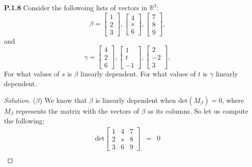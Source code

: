 \documentclass[12pt]{amsart}
\newenvironment{solution}
{\begin{proof}[Solution]}
{\end{proof}}
\begin{document}
\begin{onehalfspace}
        \noindent\textbf{P.1.8} Consider the followoing lists of vectors in $\mathbb{R}^3:$
        \begin{displaymath}
            \beta = \left[\begin{matrix} 1 \\ 2 \\ 3 \end{matrix}\right],
            \left[\begin{matrix}4 \\ s\\ 6\end{matrix}\right],
            \left[\begin{matrix}7 \\ 8\\ 9\end{matrix}\right],
        \end{displaymath}
        and
        \begin{displaymath}
            \gamma = \left[\begin{matrix} 4 \\ 2 \\ 6 \end{matrix}\right],
            \left[\begin{matrix}1 \\ t\\ -1\end{matrix}\right],
            \left[\begin{matrix}2 \\ -2\\ 3\end{matrix}\right],
        \end{displaymath}
        For what values of $s$ is $\beta$ linearly dependent. For what values of $t$
        is $\gamma$ linearly dependent.
        \begin{solution}
            ($\beta$) We know that $\beta$ is linearly dependent when $\text{det}(M_\beta) = 0$, where $M_\beta$
            represents the matrix with the vectors of $\beta$ as its columns. So let us compute the
            following:
            \begin{eqnarray*}
                \text{det}\left[\begin{matrix}
                                    1 & 4 & 7 \\
                                    2 & s & 8 \\
                                    3 & 6 & 9
                \end{matrix}\right] & = & 0 \\

\end{eqnarray*}
\end{solution}
\end{onehalfspace}
\end{document}
